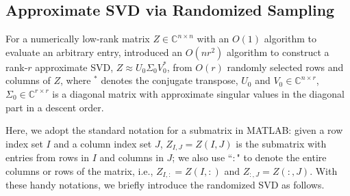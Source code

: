 \documentclass[11pt]{article}
\begin{document}
\subsection{Approximate SVD via Randomized Sampling}
\label{sec:SVD}
For a numerically low-rank matrix $Z\in\mathbb{C}^{n\times n}$ with an $O(1)$ algorithm to evaluate an arbitrary entry, \cite{engquist2009} introduced an $O(n r^2)$ algorithm to construct a rank-$r$ approximate SVD, $Z \approx U_{0}\Sigma_{0}V_{0}^{*}$, from $O(r)$ randomly selected rows and columns of $Z$, where $^*$ denotes the conjugate transpose, $U_0$ and $V_0\in\mathbb{C}^{n\times r}$, $\Sigma_{0}\in \mathbb{C}^{r\times r}$ is a diagonal matrix with approximate singular values in the diagonal part in a descent order. 



Here, we adopt the standard notation for a submatrix in MATLAB: given a row index set $I$ and a column index set $J$, $Z_{I,J} = Z(I,J)$ is the submatrix with entries from rows in $I$ and columns in $J$; we also use ``$:$" to denote the entire columns or rows of the matrix, i.e., $Z_{I,:} = Z(I,:)$ and $Z_{:,J} = Z(:,J)$. With these handy notations, we briefly introduce the randomized SVD as follows.
\end{document}
